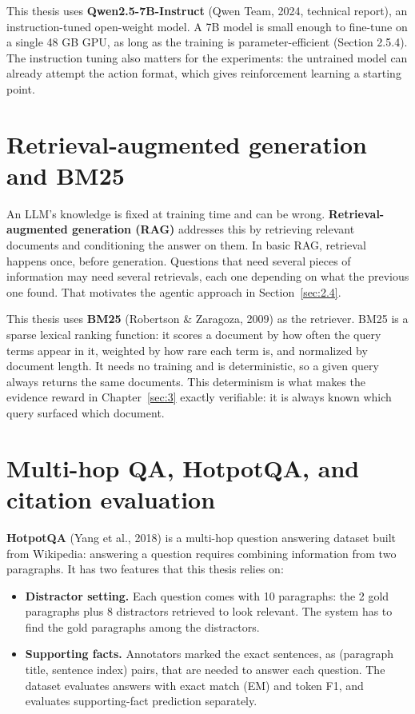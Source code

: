 This thesis uses \textbf{Qwen2.5-7B-Instruct} (Qwen Team, 2024,
technical report), an instruction-tuned open-weight model. A 7B model is
small enough to fine-tune on a single 48 GB GPU, as long as the training
is parameter-efficient (Section 2.5.4). The instruction tuning also
matters for the experiments: the untrained model can already attempt the
action format, which gives reinforcement learning a starting point.

\section{Retrieval-augmented generation and BM25}\label{sec:2.2}

An LLM's knowledge is fixed at training time and can be wrong.
\textbf{Retrieval-augmented generation (RAG)} addresses this by
retrieving relevant documents and conditioning the answer on them. In
basic RAG, retrieval happens once, before generation. Questions that
need several pieces of information may need several retrievals, each one
depending on what the previous one found. That motivates the agentic
approach in Section~\ref{sec:2.4}.

This thesis uses \textbf{BM25} (Robertson \& Zaragoza, 2009) as the
retriever. BM25 is a sparse lexical ranking function: it scores a
document by how often the query terms appear in it, weighted by how rare
each term is, and normalized by document length. It needs no training
and is deterministic, so a given query always returns the same
documents. This determinism is what makes the evidence reward in
Chapter~\ref{sec:3} exactly verifiable: it is always known which query
surfaced which document.

\section{Multi-hop QA, HotpotQA, and citation evaluation}\label{sec:2.3}

\textbf{HotpotQA} (Yang et al., 2018) is a multi-hop question answering
dataset built from Wikipedia: answering a question requires combining
information from two paragraphs. It has two features that this thesis
relies on:

\begin{itemize}
\tightlist
\item
  \textbf{Distractor setting.} Each question comes with 10 paragraphs:
  the 2 gold paragraphs plus 8 distractors retrieved to look relevant.
  The system has to find the gold paragraphs among the distractors.
\item
  \textbf{Supporting facts.} Annotators marked the exact sentences, as
  (paragraph title, sentence index) pairs, that are needed to answer
  each question. The dataset evaluates answers with exact match (EM) and
  token F1, and evaluates supporting-fact prediction separately.
\end{itemize}


